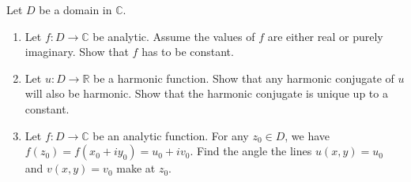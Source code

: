 \documentclass{article}
\def\C{\mathbb{C}}
\def\R{\mathbb{R}}
\begin{document}
    \begin{tcolorbox}[title=Exercise 3]
        Let $D$ be a domain in $\C$.
        \begin{enumerate}[label=(\alph*)]
            \item Let $f \colon D \to \C$ be analytic. Assume the values of $f$ are either real or purely imaginary. Show that $f$ has to be constant.
            \item Let $u \colon D \to \R$ be a harmonic function. Show that any harmonic conjugate of $u$ will also be harmonic. Show that the harmonic conjugate is unique up to a constant.
            \item Let $f \colon D \to \C$ be an analytic function. For any $z_0 \in D$, we have $f(z_0) = f(x_0 + iy_0) = u_0 + iv_0$. Find the angle the lines $u(x, y) = u_0$ and $v(x, y) = v_0$ make at $z_0$.
        \end{enumerate}
    \end{tcolorbox}
\end{document}
